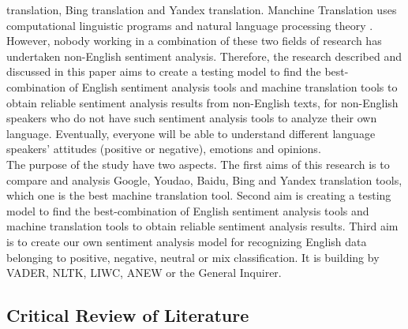 \documentclass[conference]{IEEEtran}
\begin{document}
translation, Bing translation and Yandex translation.
Manchine Translation uses computational linguistic programs and natural language
processing theory \cite{machineTranslation}.
However, nobody working in a combination of these two fields of research has undertaken non-English
sentiment analysis. Therefore, the research described and discussed in this paper aims to create a testing model to find the best-combination of English
sentiment analysis tools and machine translation tools to obtain reliable
sentiment analysis results from non-English texts, for non-English speakers who
do not have such sentiment analysis tools to analyze their own language.
Eventually, everyone will be able to understand different language speakers'
attitudes (positive or negative), emotions and opinions.\\
The purpose of the study have two aspects.
The first aims of this research is to compare and analysis Google, Youdao, Baidu, Bing and
Yandex translation tools, which one is the best machine translation tool.
Second aim is creating a testing model to find the best-combination of English
sentiment analysis tools and machine translation tools to obtain reliable
sentiment analysis results.
Third aim is to create our own sentiment analysis model for
recognizing English data belonging to positive, negative, neutral or mix
classification. It is building by VADER, NLTK, LIWC, ANEW or the General Inquirer.
\subsection{Critical Review of Literature}
\end{document}
